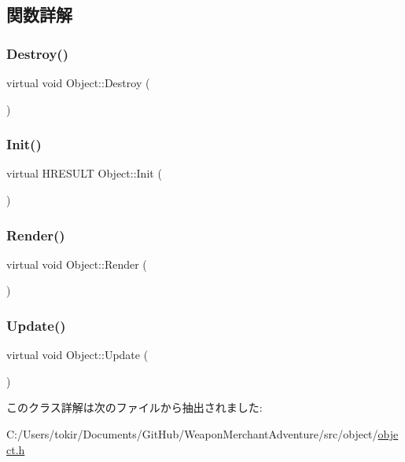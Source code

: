 \subsection{関数詳解}
\mbox{\label{class_object_acd8a6b7eebef988f20f6bf8c53d9b4bc}} 
\subsubsection{\texorpdfstring{Destroy()}{Destroy()}}
{\footnotesize\ttfamily virtual void Object\+::\+Destroy (\begin{DoxyParamCaption}{ }\end{DoxyParamCaption})\hspace{0.3cm}{\ttfamily [pure virtual]}}

\mbox{\label{class_object_a6e2cc01de0a4cf70bb779c059860eced}} 
\subsubsection{\texorpdfstring{Init()}{Init()}}
{\footnotesize\ttfamily virtual H\+R\+E\+S\+U\+LT Object\+::\+Init (\begin{DoxyParamCaption}{ }\end{DoxyParamCaption})\hspace{0.3cm}{\ttfamily [pure virtual]}}

\mbox{\label{class_object_a19d531b9d8086ece15c228899ce456bf}} 
\subsubsection{\texorpdfstring{Render()}{Render()}}
{\footnotesize\ttfamily virtual void Object\+::\+Render (\begin{DoxyParamCaption}{ }\end{DoxyParamCaption})\hspace{0.3cm}{\ttfamily [pure virtual]}}

\mbox{\label{class_object_a5ee5c17a09981cbd7c469370e210b4ff}} 
\subsubsection{\texorpdfstring{Update()}{Update()}}
{\footnotesize\ttfamily virtual void Object\+::\+Update (\begin{DoxyParamCaption}{ }\end{DoxyParamCaption})\hspace{0.3cm}{\ttfamily [pure virtual]}}



このクラス詳解は次のファイルから抽出されました\+:\begin{DoxyCompactItemize}
\item 
C\+:/\+Users/tokir/\+Documents/\+Git\+Hub/\+Weapon\+Merchant\+Adventure/src/object/\mbox{\hyperlink{object_8h}{object.\+h}}\end{DoxyCompactItemize}
